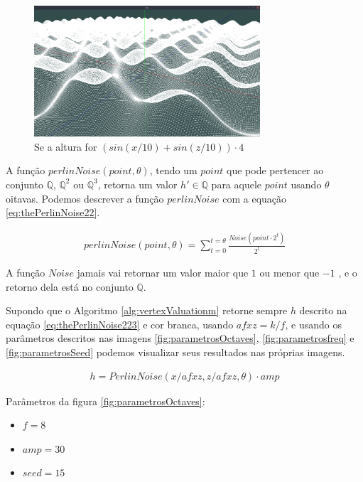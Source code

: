 \begin{figure}[H]
    \centering
    \includegraphics[width=0.75\textwidth]{figuras/sssins.png}
    \caption{Se a altura for $(sin(x/10) + sin(z/10)) \cdot 4$}
    \label{fig:sssins}
\end{figure}

A função $perlinNoise(point, \theta)$, tendo um $point$ que pode pertencer ao
conjunto $\mathbb{Q}$, $\mathbb{Q}^{2}$ ou $\mathbb{Q}^{3}$, retorna um valor $h' \in \mathbb{Q}$ para aquele $point$
usando $\theta$ oitavas. Podemos descrever a função $perlinNoise$ com a equação \ref{eq:thePerlinNoise22}.

\begin{equation}\label{eq:thePerlinNoise22}
  \begin{split}
    perlinNoise(point, \theta) = \sum_{t=0}^{t=\theta} \frac{Noise(point \cdot 2^{t})}{2^{t}}
  \end{split}
\end{equation}

A função $Noise$ jamais vai retornar um valor maior que $1$ ou menor que $-1$ \cite{perlin1985image}, e o retorno dela
está no conjunto $\mathbb{Q}$.

Supondo que o Algoritmo \ref{alg:vertexValuationm} retorne sempre $h$ descrito na equação \ref{eq:thePerlinNoise223}
e cor branca, usando $afxz = k/f$, e usando os parâmetros descritos nas imagens \ref{fig:parametrosOctaves},
\ref{fig:parametrosfreq} e \ref{fig:parametrosSeed} podemos visualizar seus resultados nas próprias imagens.

\begin{equation}\label{eq:thePerlinNoise223}
  \begin{split}
    h = PerlinNoise(x/afxz, z/afxz, \theta) \cdot amp
  \end{split}
\end{equation}

Parâmetros da figura \ref{fig:parametrosOctaves}:
\begin{itemize}
    \item $f = 8$
    \item $amp = 30$
    \item $seed = 15$
\end{itemize}

